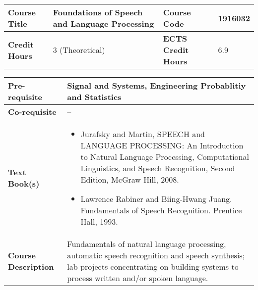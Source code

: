 \documentclass[12pt]{article}
\begin{document}
\bigskip
\bigskip


\begin{minipage}{\textwidth}
\begin{tabularx}{\textwidth}{|l|X|l|X|}
\hline
\textbf{Course Title}       &   Foundations of Speech and Language Processing & \textbf{Course Code}       & 1916032  \\ \hline
\textbf{Credit Hours}       &   3 (Theoretical) & \textbf{ECTS Credit Hours}       & 6.9  \\ \hline
\end{tabularx}

\begin{tabularx}{\textwidth}{|l|X|}
\hline
\textbf{Pre-requisite}      &   Signal and Systems, Engineering Probablitiy and Statistics \\ \hline
\textbf{Co-requisite}       &  -- \\ \hline
\textbf{Text Book(s)}      & \begin{minipage}{.70\textwidth}
					\begin{itemize} \itemsep-0.4em
						\vspace{3mm}
						\item Jurafsky and Martin, SPEECH and LANGUAGE PROCESSING: An Introduction to Natural Language Processing, Computational Linguistics, and Speech Recognition, Second Edition, McGraw Hill, 2008.
						\item Lawrence Rabiner and Biing-Hwang Juang. Fundamentals of Speech Recognition. Prentice Hall, 1993.
						\vspace{3mm}
					\end{itemize}
				\end{minipage}  \\ \hline
\textbf{Course Description} & \begin{minipage}{.70\textwidth}
					\vspace{3mm}
					Fundamentals of natural language processing, automatic speech recognition and speech synthesis; lab projects concentrating on building systems to process written and/or spoken language. 

					\vspace{3mm}
					\end{minipage} \\ \hline
\end{tabularx}
\end{minipage}


\bigskip
\bigskip
\end{document}
